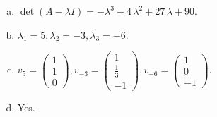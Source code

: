 \begin{questions}
\begin{solution}
\begin{enumerate}[(a)]
\item $\det(A-\lambda I)=-{\lambda}^{3} - 4 \, {\lambda}^{2} + 27 \, {\lambda} + 90$.
\item ${\lambda}_1=5, {\lambda}_2=-3, {\lambda}_3=-6$.
\item $v_{5}=\left(\begin{array}{r}
1 \\
1 \\
0
\end{array}\right), v_{-3}=\left(\begin{array}{r}
1 \\
\frac{1}{3} \\
-1
\end{array}\right), v_{-6}=\left(\begin{array}{r}
1 \\
0 \\
-1
\end{array}\right)$.
\item Yes.
\end{enumerate}
\end{solution}

\end{questions}

\newpage


\begin{center}
\end{center}

